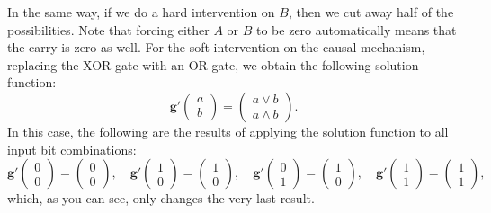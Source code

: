 \begin{gradedsolution}
\begin{enumerate}
      In the same way, if we do a hard intervention on $B$, then we cut away half of the possibilities.
      Note that forcing either $A$ or $B$ to be zero automatically means that the carry is zero as well.
      For the soft intervention on the causal mechanism, replacing the XOR gate with an OR gate, we obtain the following solution function:
      \begin{equation}
	\boldsymbol{g}' \begin{pmatrix} a \\ b\end{pmatrix} = \begin{pmatrix} a \lor b \\ a \land b \end{pmatrix}.
	\label{eq:new_solution_function}
      \end{equation}
      In this case, the following are the results of applying the solution function to all input bit combinations:
      \begin{equation}
        \boldsymbol{g}' \begin{pmatrix} 0 \\ 0\end{pmatrix} = \begin{pmatrix} 0 \\ 0\end{pmatrix}, \quad 
	\boldsymbol{g}'  \begin{pmatrix} 1 \\ 0\end{pmatrix} = \begin{pmatrix} 1 \\ 0\end{pmatrix}, \quad 
	\boldsymbol{g}' \begin{pmatrix} 0 \\ 1\end{pmatrix} = \begin{pmatrix} 1 \\ 0\end{pmatrix}, \quad 
	\boldsymbol{g}' \begin{pmatrix} 1 \\ 1\end{pmatrix} = \begin{pmatrix} 1 \\ 1\end{pmatrix},
	\label{eq:adapted_concrete_solutions}
      \end{equation}
      which, as you can see, only changes the very last result.
    \end{enumerate}

\end{gradedsolution}
